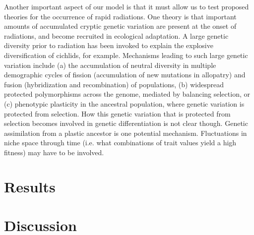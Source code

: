 \documentclass[]{article}
\begin{document}
Another important aspect of our model is that it must allow us to test proposed theories for the occurrence of rapid radiations. One theory is that important amounts of accumulated cryptic genetic variation are present at the onset of radiations, and become recruited in ecological adaptation. A large genetic diversity prior to radiation has been invoked to explain the explosive diversification of cichlids, for example. Mechanisms leading to such large genetic variation include (a) the accumulation of neutral diversity in multiple demographic cycles of fission (accumulation of new mutations in allopatry) and fusion (hybridization and recombination) of populations, (b) widespread protected polymorphisms across the genome, mediated by balancing selection, or (c) phenotypic plasticity in the ancestral population, where genetic variation is protected from selection. How this genetic variation that is protected from selection becomes involved in genetic differentiation is not clear though. Genetic assimilation from a plastic ancestor is one potential mechanism. Fluctuations in niche space through time (i.e. what combinations of trait values yield a high fitness) may have to be involved.

\section*{Results}

\section*{Discussion}
\end{document}
